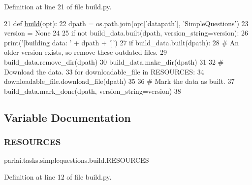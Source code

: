 Definition at line 21 of file build.\+py.


\begin{DoxyCode}
21 \textcolor{keyword}{def }\hyperlink{namespacedialog__babi__feedback_1_1build_a7a9d289f7493a5ded13c4b7f071b6184}{build}(opt):
22     dpath = os.path.join(opt[\textcolor{stringliteral}{'datapath'}], \textcolor{stringliteral}{'SimpleQuestions'})
23     version = \textcolor{keywordtype}{None}
24 
25     \textcolor{keywordflow}{if} \textcolor{keywordflow}{not} build\_data.built(dpath, version\_string=version):
26         print(\textcolor{stringliteral}{'[building data: '} + dpath + \textcolor{stringliteral}{']'})
27         \textcolor{keywordflow}{if} build\_data.built(dpath):
28             \textcolor{comment}{# An older version exists, so remove these outdated files.}
29             build\_data.remove\_dir(dpath)
30         build\_data.make\_dir(dpath)
31 
32         \textcolor{comment}{# Download the data.}
33         \textcolor{keywordflow}{for} downloadable\_file \textcolor{keywordflow}{in} RESOURCES:
34             downloadable\_file.download\_file(dpath)
35 
36         \textcolor{comment}{# Mark the data as built.}
37         build\_data.mark\_done(dpath, version\_string=version)
38 \end{DoxyCode}


\subsection{Variable Documentation}
\mbox{\label{namespaceparlai_1_1tasks_1_1simplequestions_1_1build_a571d66973416f3bda303b6d425b4825c}} 
\subsubsection{\texorpdfstring{R\+E\+S\+O\+U\+R\+C\+ES}{RESOURCES}}
{\footnotesize\ttfamily parlai.\+tasks.\+simplequestions.\+build.\+R\+E\+S\+O\+U\+R\+C\+ES}



Definition at line 12 of file build.\+py.

